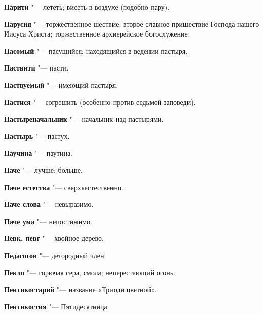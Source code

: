 \begin{mymulticols}{2}
\noindent\textbf{Парити} "--- лететь; висеть в воздухе (подобно пару). 




\noindent\textbf{Парусия} "--- торжественное шествие; второе славное пришествие Господа нашего Иисуса Христа; торжественное архиерейское богослужение. 




\noindent\textbf{Пасомый} "--- пасущийся; находящийся в ведении пастыря. 




\noindent\textbf{Паствити} "--- пасти. 




\noindent\textbf{Паствуемый} "--- имеющий пастыря. 




\noindent\textbf{Пастися} "--- согрешить (особенно против седьмой заповеди). 




\noindent\textbf{Пастыреначальник} "--- начальник над пастырями. 




\noindent\textbf{Пастырь} "--- пастух. 




\noindent\textbf{Паучина} "--- паутина. 




\noindent\textbf{Паче} "--- лучше; больше. 




\noindent\textbf{Паче естества} "--- сверхъестественно. 




\noindent\textbf{Паче слова} "--- невыразимо. 




\noindent\textbf{Паче ума} "--- непостижимо. 




\noindent\textbf{Певк, певг} "--- хвойное дерево. 




\noindent\textbf{Педагогон} "--- детородный член. 




\noindent\textbf{Пекло} "--- горючая сера, смола; неперестающий огонь. 




\noindent\textbf{Пентикостарий} "--- название «Триоди цветной». 




\noindent\textbf{Пентикостия} "--- Пятидесятница. 





\end{mymulticols}
